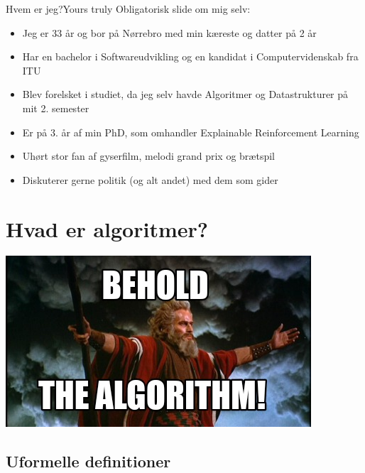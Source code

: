 \documentclass[aspectratio=1610]{beamer}
\begin{document}
\begin{frame}{Hvem er jeg?}{Yours truly}
    Obligatorisk slide om mig selv:

    \begin{itemize}[<+->]
        \item Jeg er 33 år og bor på Nørrebro med min kæreste og datter på 2 år
        \item Har en bachelor i Softwareudvikling og en kandidat i
            Computervidenskab fra ITU
        \item Blev forelsket i studiet, da jeg selv havde Algoritmer og
            Datastrukturer på mit 2. semester
        \item Er på 3. år af min PhD, som omhandler Explainable Reinforcement
            Learning
        \item Uhørt stor fan af gyserfilm, melodi grand prix og brætspil
        \item Diskuterer gerne politik (og alt andet) med dem som gider
    \end{itemize}
\end{frame}



\section{Hvad er algoritmer?}%

\begin{frame}{}{}
    \includegraphics[width=\textwidth]{behold-the-algorithm}
\end{frame}



\subsection{Uformelle definitioner}
\end{document}
